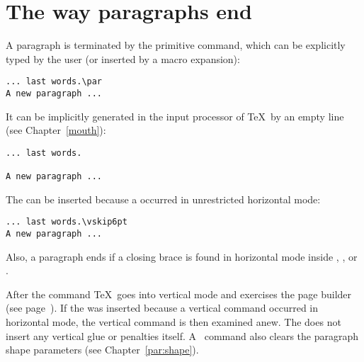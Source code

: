 \section{The way paragraphs end}


A paragraph is terminated by the primitive  command, 
which can
be explicitly typed by the user (or inserted by
a macro expansion):
\begin{verbatim}
... last words.\par
A new paragraph ...
\end{verbatim}
It can be implicitly generated in the input processor of \TeX\
by an empty line (see Chapter~\ref{mouth}):
\begin{verbatim}
... last words.

A new paragraph ...
\end{verbatim} 
The \cs{par} can be inserted because a \gr{vertical command}
occurred in unrestricted horizontal mode:
\begin{verbatim}
... last words.\vskip6pt
A new paragraph ...
\end{verbatim}
Also, a paragraph ends if a closing brace is found
in horizontal mode inside , , or .

After the  command \TeX\ goes into vertical mode
and exercises the page builder (see page~\pageref{par:page:build}).
If the \cs{par} was inserted because a vertical command occurred in
horizontal mode, the vertical command is then examined anew.
The  does not insert any vertical
glue or penalties itself. A~\cs{par} command also clears
the paragraph shape parameters (see Chapter~\ref{par:shape}).

